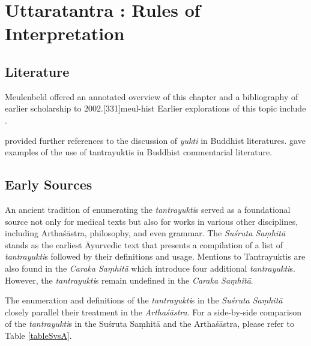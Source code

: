 
\chapter{Uttaratantra :  Rules of Interpretation}

\section{Literature} 

Meulenbeld offered an annotated overview of this chapter and a bibliography
of earlier scholarship to 2002.[331]{meul-hist}  Earlier explorations 
of this topic include \cite{dasg-1952,
lele-1981,
mejo-2000,
nara-1949,
ober-1967,
scha-1993,
sing-2003,
muth-1976}. 


\citet[105--106, fn.\,109]{prei-2013} provided further references to the
discussion of \emph{yukti} in Buddhist literatures. \citet{mane-2008}
gave examples of the use of tantrayuktis in Buddhist commentarial
literature.


\section{Early Sources}

An ancient tradition of enumerating the \textit{tantrayukti}s served as a foundational source not only for medical texts but also for works in various other disciplines, including Arthaśāstra, philosophy, and even grammar. The \textit{Suśruta Saṃhitā} stands as the earliest Āyurvedic text that presents a compilation of a list of \textit{tantrayukti}s followed by their definitions and usage. Mentions to Tantrayuktis are also found in the \textit{Caraka Saṃhitā}  which introduce four additional \textit{tantrayukti}s. However, the \textit{tantrayukti}s remain undefined in the \textit{Caraka Saṃhitā}. 

The enumeration and definitions of the \textit{tantrayukti}s in the \textit{Suśruta Saṃhitā} closely parallel their treatment in the \textit{Arthaśāstra}. For a side-by-side comparison of the \textit{tantrayukti}s in the Suśruta Saṃhitā and the Arthaśāstra, please refer to Table \ref{tableSvsA}.


